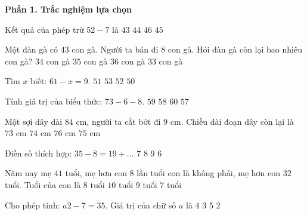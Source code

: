 \textbf{Phần 1. Trắc nghiệm lựa chọn}

\begin{ex} %
Kết quả của phép trừ $52 - 7$ là
\choice
{$43$}
{$44$}
{$46$}
{\True $45$}
\end{ex}

\begin{ex} %
Một đàn gà có $43$ con gà. Người ta bán đi $8$ con gà. Hỏi đàn gà còn lại bao nhiêu con gà?
\choice
{$34$ con gà}
{\True $35$ con gà}
{$36$ con gà}
{$33$ con gà}
\end{ex}

\begin{ex} %
Tìm $x$ biết: $61 - x = 9$.
\choice
{$51$}
{$53$}
{\True $52$}
{$50$}
\end{ex}

\begin{ex} %
Tính giá trị của biểu thức: $73 - 6 - 8$.
\choice
{\True $59$}
{$58$}
{$60$}
{$57$}
\end{ex}

\begin{ex} %
Một sợi dây dài $84\text{ cm}$, người ta cắt bớt đi $9\text{ cm}$. Chiều dài đoạn dây còn lại là
\choice
{$73\text{ cm}$}
{$74\text{ cm}$}
{$76\text{ cm}$}
{\True $75\text{ cm}$}
\end{ex}

\begin{ex} %
Điền số thích hợp: $35 - 8 = 19 + \dots$
\choice
{$7$}
{\True $8$}
{$9$}
{$6$}
\end{ex}

\begin{ex} %
Năm nay mẹ $41$ tuổi, mẹ hơn con $8$ lần tuổi con là không phải, mẹ hơn con $32$ tuổi. Tuổi của con là
\choice
{$8$ tuổi}
{$10$ tuổi}
{\True $9$ tuổi}
{$7$ tuổi}
\end{ex}

\begin{ex} %
Cho phép tính: $\overline{a2} - 7 = 35$. Giá trị của chữ số $a$ là
\choice
{\True $4$}
{$3$}
{$5$}
{$2$}
\end{ex}

